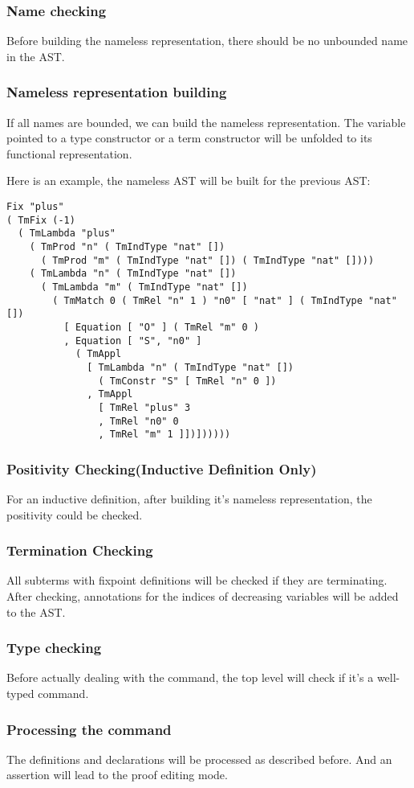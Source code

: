 \subsubsection*{Name checking}
Before building the nameless representation, there should be no unbounded name in the AST.
\subsubsection*{Nameless representation building}
If all names are bounded, we can build the nameless representation. The variable pointed to
a type constructor or a term constructor will be unfolded to its functional representation.

Here is an example, the nameless AST will be built for the previous AST:
\begin{center}
\begin{minipage}{0.9\textwidth}
\begin{verbatim}
Fix "plus"
( TmFix (-1)
  ( TmLambda "plus"
    ( TmProd "n" ( TmIndType "nat" [])
      ( TmProd "m" ( TmIndType "nat" []) ( TmIndType "nat" [])))
    ( TmLambda "n" ( TmIndType "nat" [])
      ( TmLambda "m" ( TmIndType "nat" [])
        ( TmMatch 0 ( TmRel "n" 1 ) "n0" [ "nat" ] ( TmIndType "nat" [])
          [ Equation [ "O" ] ( TmRel "m" 0 )
          , Equation [ "S", "n0" ]
            ( TmAppl 
              [ TmLambda "n" ( TmIndType "nat" [])
                ( TmConstr "S" [ TmRel "n" 0 ])
              , TmAppl
                [ TmRel "plus" 3
                , TmRel "n0" 0
                , TmRel "m" 1 ]])])))))
\end{verbatim}
\end{minipage}
\end{center}
\subsubsection*{Positivity Checking(Inductive Definition Only)}
For an inductive definition, after building it's nameless representation, the positivity
could be checked.
\subsubsection*{Termination Checking}
All subterms with fixpoint definitions will be checked if they are terminating. After checking,
annotations for the indices of decreasing variables will be added to the AST.
\subsubsection*{Type checking}
Before actually dealing with the command, the top level will check if it's a well-typed command.
\subsubsection*{Processing the command}
The definitions and declarations will be processed as described before. And an assertion will lead to the proof editing mode.

